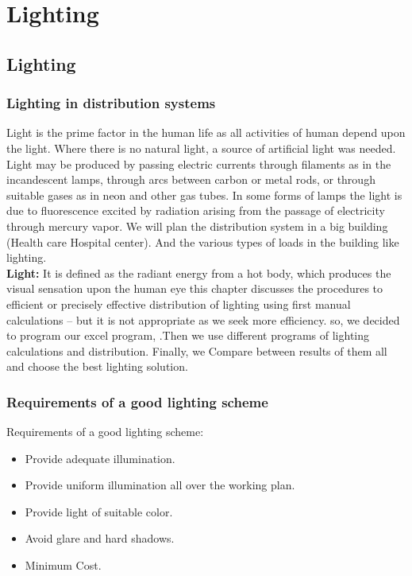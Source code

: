 \documentclass[12pt,fleqn]{book} %
\begin{document}
\part{Lighting}
\chapter{Lighting}
\section{Lighting in distribution systems}
Light is the prime factor in the human life as all activities of human depend upon the light. Where there is no natural light, a source of artificial light was needed. Light may be produced by passing electric currents through filaments as in the incandescent lamps, through arcs between carbon or metal rods, or through suitable gases as in neon and other gas tubes. In some forms of lamps the light is due to fluorescence excited by radiation arising from the passage of electricity through mercury vapor. We will plan the distribution system in a big building (Health care Hospital center). And the various types of loads in the building like lighting.\\
\textbf {Light:} It is defined as the radiant energy from a hot body, which produces the visual sensation upon the human eye this chapter discusses the procedures to efficient or precisely effective distribution of lighting using first manual calculations – but it is not appropriate as we seek more efficiency. so, we decided to program our excel program, .Then we use different programs of lighting calculations and distribution. Finally, we Compare between results of them all and choose the best lighting solution.


\section{Requirements of a good lighting scheme}
Requirements of a good lighting scheme:
\begin{itemize}
\item  Provide adequate illumination.
\item Provide uniform illumination all over the working plan.
\item Provide light of suitable color.
\item Avoid glare and hard shadows.
\item Minimum Cost.
 \end{itemize}
\end{document}
